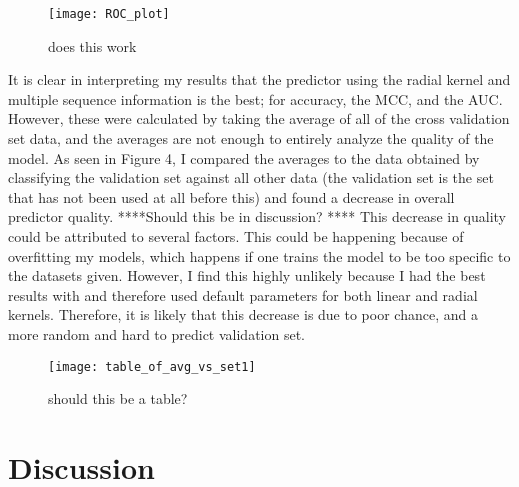 \documentclass[final]{article}
\begin{document}
\begin{figure}
\texttt{[image: ROC\_plot]}
\caption{does this work \label{figure1}}
\end{figure}


It is clear in interpreting my results that the predictor using the radial kernel and multiple sequence information is the best; for accuracy, the MCC, and the AUC. However, these were calculated by taking the average of all of the cross validation set data, and the averages are not enough to entirely analyze the quality of the model. As seen in Figure 4, I compared the averages to the data obtained by classifying the validation set against all other data (the validation set is the set that has not been used at all before this) and found a decrease in overall predictor quality. ****Should this be in discussion? ****    This decrease in quality could be attributed to several factors. This could be happening because of overfitting my models, which happens if one trains the model to be too specific to the datasets given. However, I find this highly unlikely because I had the best results with and therefore used default parameters for both linear and radial kernels. Therefore, it is likely that this decrease is due to poor chance, and a more random and hard to predict validation set. 


\begin{figure}
\texttt{[image: table\_of\_avg\_vs\_set1]}
\caption{should this be a table?\label{figure1}}
\end{figure}

\section{Discussion}
\end{document}

